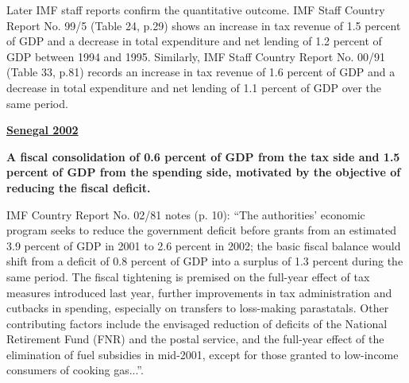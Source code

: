 Later IMF staff reports confirm the quantitative outcome. IMF Staff Country Report No. 99/5 (Table 24, p.29) shows an increase in tax revenue of 1.5 percent of GDP and a decrease in total expenditure and net lending of 1.2 percent of GDP between 1994 and 1995. Similarly, IMF Staff Country Report No. 00/91 (Table 33, p.81) records an increase in tax revenue of 1.6 percent of GDP and a decrease in total expenditure and net lending of 1.1 percent of GDP over the same period. 

\textbf{\underline{Senegal 2002}}

\textbf{A fiscal consolidation of 0.6 percent of GDP from the tax side and 1.5 percent of GDP from the spending side, motivated by the objective of reducing the fiscal deficit.}

IMF Country Report No. 02/81 notes (p. 10): “The authorities' economic program seeks to reduce the government deficit before grants from an estimated 3.9 percent of GDP in 2001 to 2.6 percent in 2002; the basic fiscal balance would shift from a deficit of 0.8 percent of GDP into a surplus of 1.3 percent during the same period. The fiscal tightening is premised on the full-year effect of tax measures introduced last year, further improvements in tax administration and cutbacks in spending, especially on transfers to loss-making parastatals. Other contributing factors include the envisaged reduction of deficits of the National Retirement Fund (FNR) and the postal service, and the full-year effect of the elimination of fuel subsidies in mid-2001, except for those granted to low-income consumers of cooking gas...”. 

